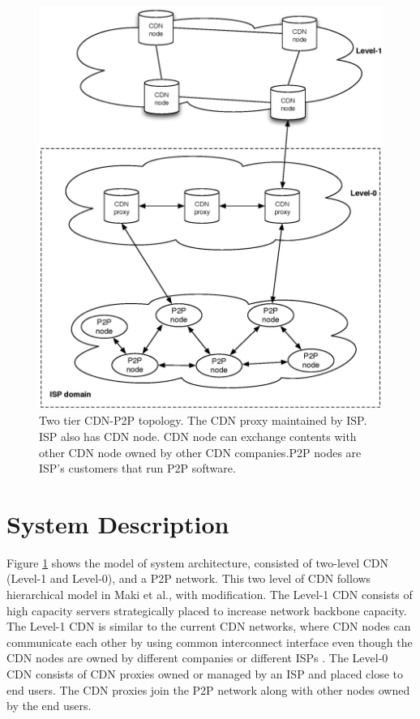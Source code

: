 \documentclass[paper]{ieice}
\begin{document}
\begin{figure}[hb]
\begin{center}
\includegraphics[scale=0.4]{graphs/two-tier-cdn-topology.eps}
\end{center}
\caption{Two tier CDN-P2P topology.
The CDN proxy maintained by ISP. ISP also has CDN node. CDN node can exchange contents with other CDN node owned by other CDN companies.P2P nodes are ISP's customers that run P2P software.}
\label{fig:twotier}
\vspace{-2mm}
\end{figure} 


 
\section{System Description}\label{description}

Figure \ref{fig:twotier} shows the model of system architecture, consisted of two-level CDN (Level-1 and Level-0), and a P2P network.
This two level of CDN follows hierarchical model in Maki et al.,\cite{NaoyaMAKI2012} with modification.
The Level-1 CDN consists of high capacity servers strategically placed to increase network backbone capacity.
The Level-1 CDN is similar to the current CDN networks, where CDN nodes can communicate each other by using common interconnect interface even though the CDN nodes are owned by different companies or different ISPs \cite{cdni}.
The Level-0 CDN consists of CDN proxies owned or managed by an ISP and placed close to end users.
The CDN proxies join the P2P network along with other nodes owned by the end users.
\end{document}

